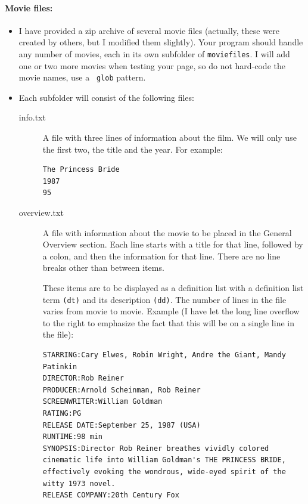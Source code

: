 \documentclass{article}
\begin{document}
\paragraph{Movie files:}
\begin{itemize}
\item
I have provided a zip archive of several movie files (actually, these
were created by others, but I modified them slightly).
Your program should handle any number of movies, each in its own
subfolder of {\tt moviefiles}.  I will add one or two more movies when
testing your page, so do not hard-code the movie names, use a {\tt
  glob} pattern.
\item
Each subfolder will consist of the following files:
\begin{description}
\item[info.txt] A file with three lines of information about the
  film. We will only use the first two, the title and the year.  For
  example: 
\begin{Verbatim}[frame=single]
The Princess Bride
1987
95
\end{Verbatim}
\item[overview.txt] A file with information about the movie to be
  placed in the General Overview section.  Each line starts with a
  title for that line, followed by a colon, and then the information
  for that line.  There are no line breaks other than between items.

  These items are to  be displayed as a definition list with a
  definition list term \verb|(dt)| and its description \verb|(dd)|.
  The number of lines in the file varies from movie to movie.  Example
  (I have let the long line overflow to the right to emphasize the
  fact that this will be on a single line in the file):
\begin{Verbatim}[frame=single]
STARRING:Cary Elwes, Robin Wright, Andre the Giant, Mandy Patinkin
DIRECTOR:Rob Reiner
PRODUCER:Arnold Scheinman, Rob Reiner
SCREENWRITER:William Goldman
RATING:PG
RELEASE DATE:September 25, 1987 (USA)
RUNTIME:98 min
SYNOPSIS:Director Rob Reiner breathes vividly colored cinematic life into William Goldman's THE PRINCESS BRIDE, effectively evoking the wondrous, wide-eyed spirit of the witty 1973 novel.
RELEASE COMPANY:20th Century Fox
\end{Verbatim}


\end{description}
\end{itemize}
\end{document}
